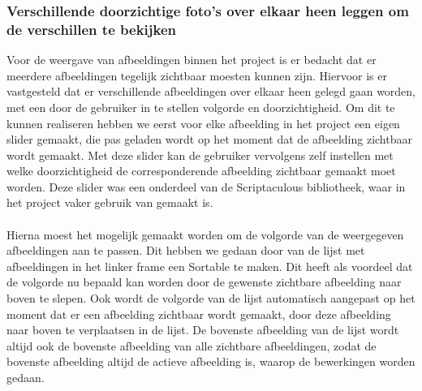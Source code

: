 \subsubsection{Verschillende doorzichtige foto's over elkaar heen leggen om de verschillen te bekijken}
Voor de weergave van afbeeldingen binnen het project is er bedacht dat er meerdere afbeeldingen tegelijk zichtbaar moesten kunnen zijn.
Hiervoor is er vastgesteld dat er verschillende afbeeldingen over elkaar heen gelegd gaan worden, met een door de gebruiker in te stellen volgorde en doorzichtigheid.
Om dit te kunnen realiseren hebben we eerst voor elke afbeelding in het project een eigen slider gemaakt, die pas geladen wordt op het moment dat de afbeelding zichtbaar wordt gemaakt. 
Met deze slider kan de gebruiker vervolgens zelf instellen met welke doorzichtigheid de corresponderende afbeelding zichtbaar gemaakt moet worden.
Deze slider was een onderdeel van de Scriptaculous bibliotheek, waar in het project vaker gebruik van gemaakt is.
\\
\\
Hierna moest het mogelijk gemaakt worden om de volgorde van de weergegeven afbeeldingen aan te passen.
Dit hebben we gedaan door van de lijst met afbeeldingen in het linker frame een Sortable te maken.
Dit heeft als voordeel dat de volgorde nu bepaald kan worden door de gewenste zichtbare afbeelding naar boven te slepen.
Ook wordt de volgorde van de lijst automatisch aangepast op het moment dat er een afbeelding zichtbaar wordt gemaakt, door deze afbeelding naar boven te verplaatsen in de lijst.
De bovenste afbeelding van de lijst wordt altijd ook de bovenste afbeelding van alle zichtbare afbeeldingen, zodat de bovenste afbeelding altijd de actieve afbeelding is, waarop de bewerkingen worden gedaan.

